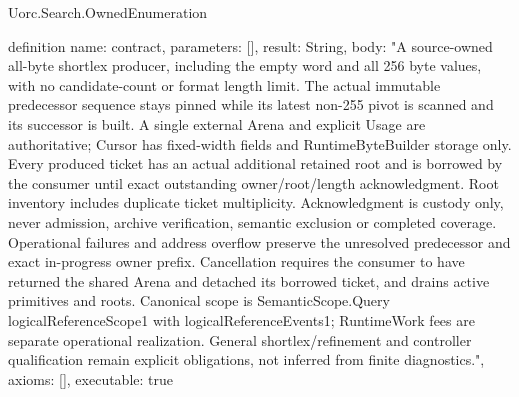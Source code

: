 \begin{lexlean}{Uorc.Search.OwnedEnumeration}
\begin{semanticmodule}
definition{
  name: contract,
  parameters: [],
  result: String,
  body: "A source-owned all-byte shortlex producer, including the empty word and all 256 byte values, with no candidate-count or format length limit. The actual immutable predecessor sequence stays pinned while its latest non-255 pivot is scanned and its successor is built. A single external Arena and explicit Usage are authoritative; Cursor has fixed-width fields and RuntimeByteBuilder storage only. Every produced ticket has an actual additional retained root and is borrowed by the consumer until exact outstanding owner/root/length acknowledgment. Root inventory includes duplicate ticket multiplicity. Acknowledgment is custody only, never admission, archive verification, semantic exclusion or completed coverage. Operational failures and address overflow preserve the unresolved predecessor and exact in-progress owner prefix. Cancellation requires the consumer to have returned the shared Arena and detached its borrowed ticket, and drains active primitives and roots. Canonical scope is SemanticScope.Query logicalReferenceScope1 with logicalReferenceEvents1; RuntimeWork fees are separate operational realization. General shortlex/refinement and controller qualification remain explicit obligations, not inferred from finite diagnostics.",
  axioms: [],
  executable: true
}
\end{semanticmodule}
\end{lexlean}
